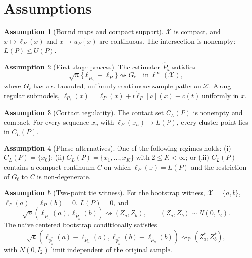 \documentclass[11pt]{article}
\renewcommand{\Pr}{\mathbb{P}}
\theoremstyle{definition}
\newtheorem{assumption}{Assumption}
\theoremstyle{plain}
\theoremstyle{remark}
\begin{document}
\section{Assumptions}
\begin{assumption}[Bound maps and compact support]\label{ass:compact-continuous}
\(\mathcal X\) is compact, and \(x\mapsto\ell_P(x)\) and \(x\mapsto u_P(x)\) are continuous.  The intersection is nonempty: \(L(P)\le U(P)\).
\end{assumption}

\begin{assumption}[First-stage process]\label{ass:first-stage-process}
The estimator \(\widehat P_n\) satisfies
\[
  \sqrt n\{\ell_{\widehat P_n}-\ell_P\}\rightsquigarrow G_\ell
  \quad\text{in }\ell^\infty(\mathcal X),
\]
where \(G_\ell\) has a.s. bounded, uniformly continuous sample paths on \(\mathcal X\).  Along regular submodels, \(\ell_{P_t}(x)=\ell_P(x)+t\dot\ell_P[h](x)+o(t)\) uniformly in \(x\).
\end{assumption}

\begin{assumption}[Contact regularity]\label{ass:contact-regularity}
The contact set \(C_L(P)\) is nonempty and compact.  For every sequence \(x_n\) with \(\ell_P(x_n)\to L(P)\), every cluster point lies in \(C_L(P)\).
\end{assumption}

\begin{assumption}[Phase alternatives]\label{ass:phase-alternatives}
One of the following regimes holds: (i) \(C_L(P)=\{x_0\}\); (ii) \(C_L(P)=\{x_1,\ldots,x_K\}\) with \(2\le K<\infty\); or (iii) \(C_L(P)\) contains a compact continuum \(C\) on which \(\ell_P(x)=L(P)\) and the restriction of \(G_\ell\) to \(C\) is non-degenerate.
\end{assumption}

\begin{assumption}[Two-point tie witness]\label{ass:two-point-witness}
For the bootstrap witness, \(\mathcal X=\{a,b\}\), \(\ell_P(a)=\ell_P(b)=0\), \(L(P)=0\), and
\[
  \sqrt n(\ell_{\widehat P_n}(a),\ell_{\widehat P_n}(b))
  \rightsquigarrow (Z_a,Z_b),
  \qquad
  (Z_a,Z_b)\sim N(0,I_2).
\]
The naive centered bootstrap conditionally satisfies
\[
  \sqrt n(\ell_{\widehat P_n^*}(a)-\ell_{\widehat P_n}(a),
           \ell_{\widehat P_n^*}(b)-\ell_{\widehat P_n}(b))
  \rightsquigarrow_{\Pr} (Z_a^*,Z_b^*),
\]
with \(N(0,I_2)\) limit independent of the original sample.
\end{assumption}
\end{document}
